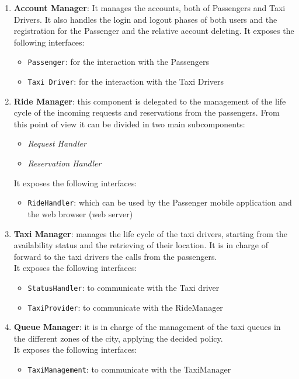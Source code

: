 \begin{enumerate}
	\item \textbf{Account Manager}: It manages the accounts, both of Passengers and Taxi Drivers. It also handles the login and logout phases of both users and the registration for the Passenger and the relative account deleting. It exposes the following interfaces:
	\begin{itemize}
		\item \texttt{Passenger}: for the interaction with the Passengers
		\item \texttt{Taxi Driver}: for the interaction with the Taxi Drivers
	\end{itemize}
	\item \textbf{Ride Manager}: this component is delegated to the management of the life cycle of the incoming requests and reservations from the passengers. From this point of view it can be divided in two main subcomponents:
	\begin{itemize}
		\item \textit{Request Handler}
		\item \textit{Reservation Handler}
	\end{itemize}
	It exposes the following interfaces:
	\begin{itemize}
		\item \texttt{RideHandler}: which can be used by the Passenger mobile application and the web browser (web server)
	\end{itemize}
	\item \textbf{Taxi Manager}: manages the life cycle of the taxi drivers, starting from the availability status and the retrieving of their location. It is in charge of forward to the taxi drivers the calls from the passengers.\\ It exposes the following interfaces:
	\begin{itemize}
		\item \texttt{StatusHandler}: to communicate with the Taxi driver
		\item \texttt{TaxiProvider}: to communicate with the RideManager
	\end{itemize}
	\item \textbf{Queue Manager}: it is in charge of the management of the taxi queues in the different zones of the city, applying the decided policy.\\
	It exposes the following interfaces:
	\begin{itemize}
		\item \texttt{TaxiManagement}: to communicate with the TaxiManager

\end{itemize}
\end{enumerate}
